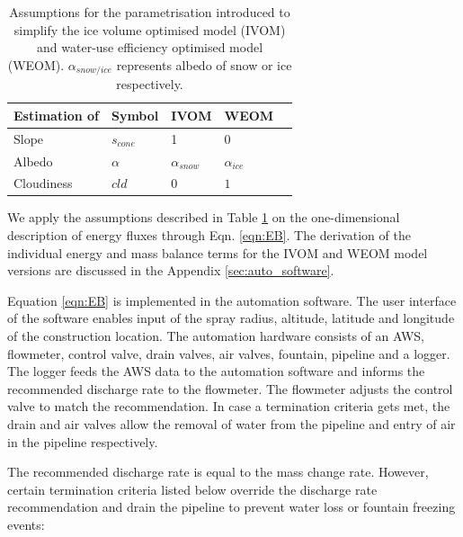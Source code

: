 \begin{table}[htb]
\centering
\caption{Assumptions for the parametrisation introduced to simplify the ice volume optimised model (IVOM) and
water-use efficiency optimised model (WEOM). $\alpha_{snow/ice}$ represents albedo of snow or ice respectively.}
\label{tab:assumptions}
\begin{tabular}{|lllll|}
\toprule
\textbf{Estimation of} & \textbf{Symbol} & \textbf{IVOM} & \textbf{WEOM} & \\\midrule
\multicolumn{1}{|l}{Slope}        & $s_{cone}$ & 1 & 0 & \multicolumn{1}{l|}{} \\ 
\multicolumn{1}{|l}{Albedo} & $\alpha$ & $\alpha_{snow}$ & $\alpha_{ice}$ & \multicolumn{1}{l|}{} \\
\multicolumn{1}{|l}{Cloudiness}  & $cld$ & $0$ & $1$ & \multicolumn{1}{l|}{} \\\bottomrule 
\end{tabular}
\end{table}

We apply the assumptions described in Table \ref{tab:assumptions} on the one-dimensional description of energy
fluxes through Eqn. \ref{eqn:EB}. The derivation of the individual energy and mass balance terms for the
\ac{IVOM} and \ac{WEOM} model versions are discussed in the Appendix \ref{sec:auto_software}.

Equation \ref{eqn:EB} is implemented in the automation software. The user interface of the software enables
input of the spray radius, altitude, latitude and longitude of the construction location. The automation
hardware consists of an AWS, flowmeter, control valve, drain valves, air valves, fountain, pipeline and a
logger. The logger feeds the AWS data to the automation software and informs the recommended discharge rate to
the flowmeter. The flowmeter adjusts the control valve to match the recommendation. In case a termination
criteria gets met, the drain and air valves allow the removal of water from the pipeline and entry of
air in the pipeline respectively.

The recommended discharge rate is equal to the mass change rate. However, certain termination criteria listed
below override the discharge rate recommendation and drain the pipeline to prevent water loss or fountain
freezing events:

